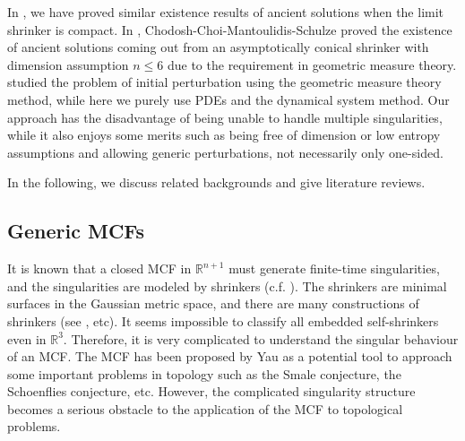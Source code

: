 \documentclass[12pt]{amsart}
\numberwithin{equation}{section}
\numberwithin{equation}{section}
\newcommand{\R}{\mathbb{R}}
\begin{document}
	In \cite{SX}, we have proved similar existence results of ancient solutions when the limit shrinker is compact. In \cite{CCMS1}, Chodosh-Choi-Mantoulidis-Schulze proved the existence of ancient solutions coming out from an asymptotically conical shrinker with dimension assumption $n\leq 6$ due to the requirement in geometric measure theory.  \cite{CCMS1} studied the problem of initial perturbation using the geometric measure theory method, while here we  purely use PDEs and the dynamical system method. Our approach has the disadvantage of being unable to handle multiple singularities, while it also enjoys some merits such as being free of dimension or low entropy assumptions and allowing generic perturbations, not necessarily only one-sided. 
	
	In the following, we discuss related backgrounds and give literature reviews. 
	\subsection{Generic MCFs}
	It is known that a closed MCF in $\R^{n+1}$ must generate finite-time singularities, and the singularities are modeled by shrinkers (c.f. \cite{H, I, Wh}). The shrinkers are minimal surfaces in the Gaussian metric space, and there are many constructions of shrinkers (see \cite{KKM}, \cite{Ngu} etc). It seems impossible to classify all embedded self-shrinkers even in $\R^3$. Therefore, it is very complicated to understand the singular behaviour of an MCF. The MCF has been proposed by Yau as a potential tool to approach some important problems in topology such as the Smale conjecture, the Schoenflies conjecture, etc.  However, the complicated singularity structure becomes a serious obstacle to the application of the MCF to topological problems. 
	
\end{document}
